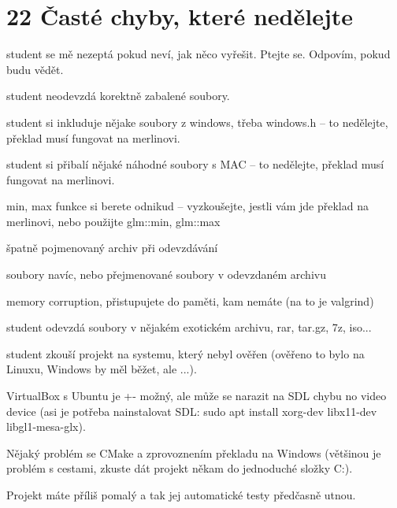 \chapter{22 Časté chyby, které nedělejte}
\hypertarget{p22_caste_chyby}{}\label{p22_caste_chyby}

\begin{DoxyEnumerate}
\item student se mě nezeptá pokud neví, jak něco vyřešit. Ptejte se. Odpovím, pokud budu vědět. 
\item student neodevzdá korektně zabalené soubory. 
\item student si inkluduje nějake soubory z windows, třeba windows.\+h -- to nedělejte, překlad musí fungovat na merlinovi. 
\item student si přibalí nějaké náhodné soubory s MAC -- to nedělejte, překlad musí fungovat na merlinovi. 
\item min, max funkce si berete odnikud -- vyzkoušejte, jestli vám jde překlad na merlinovi, nebo použijte glm\+::min, glm\+::max 
\item špatně pojmenovaný archiv při odevzdávání 
\item soubory navíc, nebo přejmenované soubory v odevzdaném archivu 
\item memory corruption, přistupujete do paměti, kam nemáte (na to je valgrind) 
\item student odevzdá soubory v nějakém exotickém archivu, rar, tar.\+gz, 7z, iso... 
\item student zkouší projekt na systemu, který nebyl ověřen (ověřeno to bylo na Linuxu, Windows by měl běžet, ale ...). 
\item Virtual\+Box s Ubuntu je +-\/ možný, ale může se narazit na SDL chybu no video device (asi je potřeba nainstalovat SDL\+: sudo apt install xorg-\/dev libx11-\/dev libgl1-\/mesa-\/glx). 
\item Nějaký problém se CMake a zprovoznením překladu na Windows (většinou je problém s cestami, zkuste dát projekt někam do jednoduché složky C\+:). 
\item Projekt máte příliš pomalý a tak jej automatické testy předčasně utnou. 
\end{DoxyEnumerate}